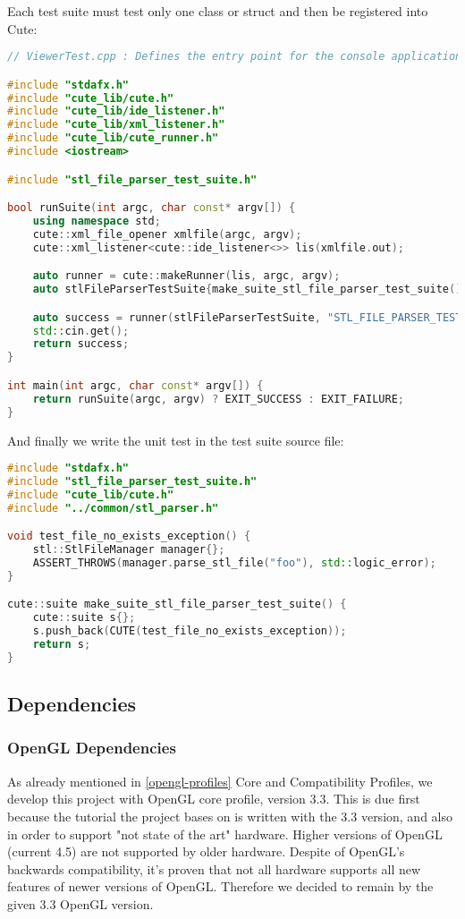Each test suite must test only one class or struct and then be registered into Cute:

\begin{lstlisting}[language=C++, caption=Test Suite registration]
// ViewerTest.cpp : Defines the entry point for the console application.

#include "stdafx.h"
#include "cute_lib/cute.h"
#include "cute_lib/ide_listener.h"
#include "cute_lib/xml_listener.h"
#include "cute_lib/cute_runner.h"
#include <iostream>

#include "stl_file_parser_test_suite.h"

bool runSuite(int argc, char const* argv[]) {
	using namespace std;
	cute::xml_file_opener xmlfile(argc, argv);
	cute::xml_listener<cute::ide_listener<>> lis(xmlfile.out);

	auto runner = cute::makeRunner(lis, argc, argv);
	auto stlFileParserTestSuite{make_suite_stl_file_parser_test_suite()};

	auto success = runner(stlFileParserTestSuite, "STL_FILE_PARSER_TEST_SUITE");
	std::cin.get();
	return success;
}

int main(int argc, char const* argv[]) {
	return runSuite(argc, argv) ? EXIT_SUCCESS : EXIT_FAILURE;
}
\end{lstlisting}

And finally we write the unit test in the test suite source file:
\begin{lstlisting}[language=C++, caption=Test Suite unit tests]
#include "stdafx.h"
#include "stl_file_parser_test_suite.h"
#include "cute_lib/cute.h"
#include "../common/stl_parser.h"

void test_file_no_exists_exception() {
	stl::StlFileManager manager{};
	ASSERT_THROWS(manager.parse_stl_file("foo"), std::logic_error);
}

cute::suite make_suite_stl_file_parser_test_suite() {
	cute::suite s{};
	s.push_back(CUTE(test_file_no_exists_exception));
	return s;
}
\end{lstlisting}


\subsection{Dependencies}

\subsubsection{OpenGL Dependencies}

As already mentioned in \ref{opengl-profiles} Core and Compatibility Profiles, we develop this project with OpenGL core profile, version 3.3. This is due first because the tutorial \cite{learnopengl} the project bases on is written with the 3.3 version, and also in order to support "not state of the art" hardware. 
Higher versions of OpenGL (current 4.5) are not supported by older hardware. Despite of OpenGL's backwards compatibility, it's proven \cite{superbible} that not all hardware supports all new features of newer versions of OpenGL. Therefore we decided to remain by the given 3.3 OpenGL version.	

